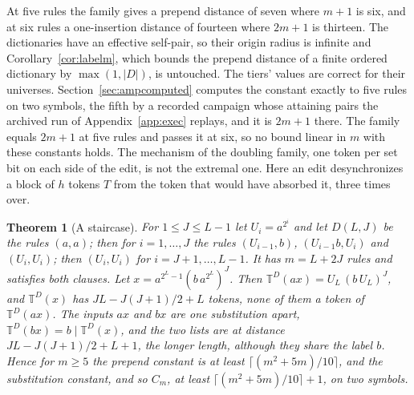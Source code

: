 \documentclass[11pt,a4paper]{article}
\theoremstyle{definition}
\theoremstyle{plain}
\newtheorem{theorem}{Theorem}
\newcommand{\T}{\mathbb{T}}
\begin{document}
At five rules the family gives a prepend distance of seven where \(m + 1\) is six, and at six rules a one-insertion
distance of fourteen where \(2m + 1\) is thirteen. The dictionaries have an effective self-pair, so their origin radius
is infinite and Corollary~\ref{cor:labelm}, which bounds the prepend distance of a finite ordered dictionary by
\(\max(1, |D|)\), is untouched. The tiers' values are correct for their universes. Section~\ref{sec:ampcomputed}
computes the constant exactly to five rules on two symbols, the fifth by a recorded campaign whose attaining pairs the
archived run of Appendix~\ref{app:exec} replays, and it is \(2m + 1\) there. The family equals \(2m + 1\) at five rules
and passes it at six, so no bound linear in \(m\) with these constants holds. The mechanism of the doubling family, one
token per set bit on each side of the edit, is not the extremal one. Here an edit desynchronizes a block of \(h\) tokens
\(T\) from the token that would have absorbed it, three times over.


\begin{theorem}[A staircase]\label{thm:staircase}
For \(1 \le J \le L - 1\) let \(U_i = a^{2^i}\) and let \(D(L, J)\) be the rules \((a, a)\); then for
\(i = 1, \dots, J\) the rules \((U_{i-1}, b)\), \((U_{i-1}b, U_i)\) and \((U_i, U_i)\); then \((U_i, U_i)\) for
\(i = J + 1, \dots, L - 1\). It has \(m = L + 2J\) rules and satisfies both clauses. Let
\(x = a^{2^L - 1}(b\,a^{2^L})^J\). Then \(\T^D(ax) = U_L\,(b\,U_L)^J\), and \(\T^D(x)\) has \(JL - J(J+1)/2 + L\)
tokens, none of them a token of \(\T^D(ax)\). The inputs \(ax\) and \(bx\) are one substitution apart,
\(\T^D(bx) = b \mid \T^D(x)\), and the two lists are at distance \(JL - J(J + 1)/2 + L + 1\), the longer length,
although they share the label \(b\). Hence for \(m \ge 5\) the prepend constant is at least
\(\lceil (m^2 + 5m)/10 \rceil\), and the substitution constant, and so \(C_m\), at least
\(\lceil (m^2 + 5m)/10 \rceil + 1\), on two symbols.
\end{theorem}
\end{document}
